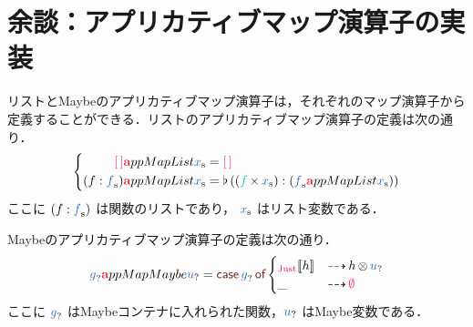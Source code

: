 \documentclass[a5paper,twoside,fleqn,draft]{jsbook}
\begin{document}
\section{余談：アプリカティブマップ演算子の実装}

リストとMaybeのアプリカティブマップ演算子は，それぞれのマップ演算子から定義することができる．リストのアプリカティブマップ演算子の定義は次の通り．
\begin{equation}
  \left\{
  \begin{aligned}
    \mEmptyList\hTypeName{a}ppMapList\hListVar{x}
    &=\mEmptyList\\
    (f:\hListVar{f})\hTypeName{a}ppMapList\hListVar{x}
    &=\mJoinList{}((\hFunc{f}\hMap\hListVar{x}):(\hListVar{f}\hTypeName{a}ppMapList\hListVar{x}))
  \end{aligned}
  \right.
\end{equation}
ここに $(f:\hListVar{f})$ は関数のリストであり， $\hListVar{x}$ はリスト変数である．

Maybeのアプリカティブマップ演算子の定義は次の通り．
\begin{equation}
\label{eq:maybe-applicative-map-by-maybe-map}
\hMaybeVar{g}\hTypeName{a}ppMapMaybe\hMaybeVar{u}
=\hCaseSyntax{\hMaybeVar{g}}
\begin{cases}
\hJustWith{h}&\hIfSo h\hMaybeMap\hMaybeVar{u}\\
\_&\hIfSo\hNothing
\end{cases}
\end{equation}
ここに $\hMaybeVar{g}$ はMaybeコンテナに入れられた関数，$\hMaybeVar{u}$ はMaybe変数である．
\end{document}
